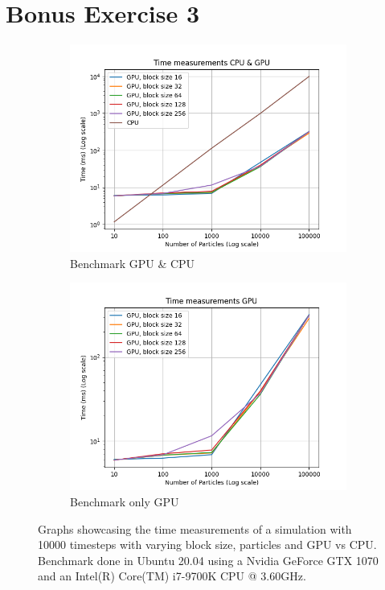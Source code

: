 \documentclass[a4paper, 12pt]{article}
\begin{document}
\section{Bonus Exercise 3}
\begin{figure}
    \centering
    \begin{subfigure}{.8\textwidth}
        \centering
        \includegraphics[width=1\linewidth]{ex_3_benchmark/ex_3.png}
        \caption{Benchmark GPU \& CPU}
        \label{fig:bench_3_both}
    \end{subfigure}
  \begin{subfigure}{.8\textwidth}
    \centering
    \includegraphics[width=1\linewidth]{ex_3_benchmark/ex_3_gpu.png}
    \caption{Benchmark only GPU}
    \label{fig:bench_3_gpu}
\end{subfigure}
\caption{Graphs showcasing the time measurements of a simulation with 10000 timesteps with varying block size, particles and GPU vs CPU. Benchmark done in Ubuntu 20.04 using a Nvidia GeForce GTX 1070 and an Intel(R) Core(TM) i7-9700K CPU @ 3.60GHz.}
\label{fig:bench_3}
\end{figure}
\end{document}
